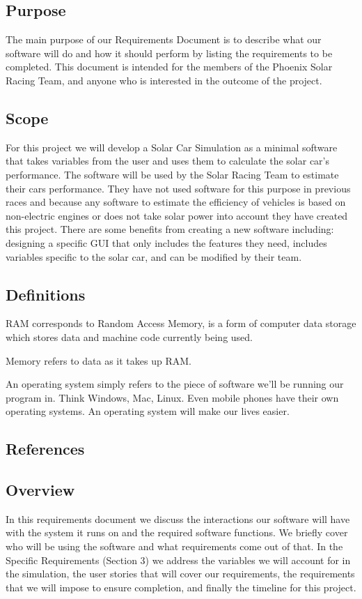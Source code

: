 \documentclass[onecolumn, draftclsnofoot,10pt, compsoc]{IEEEtran}
\begin{document}
    \subsection{Purpose}
    The main purpose of our Requirements Document is to describe what our software will do and how it should perform by listing the requirements to be completed.
    This document is intended for the members of the Phoenix Solar Racing Team, and anyone who is interested in the outcome of the project.
    
    \subsection{Scope}
    For this project we will develop a Solar Car Simulation as a minimal software that takes variables from the user and uses them to calculate the solar car's performance.
    The software will be used by the Solar Racing Team to estimate their cars performance. 
    They have not used software for this purpose in previous races and because any software to estimate the efficiency of vehicles is based on non-electric engines or does not take solar power into account they have created this project. There are some benefits from creating a new software including: designing a specific GUI that only includes the features they need, includes variables specific to the solar car, and can be modified by their team.
    
    \subsection{Definitions}
    RAM corresponds to Random Access Memory, is a form of computer data storage which stores data and machine code currently being used.
    
    Memory refers to data as it takes up RAM.
    
    An operating system simply refers to the piece of software we'll be running our program in.
    Think Windows, Mac, Linux.
    Even mobile phones have their own operating systems.
    An operating system will make our lives easier.
    
    \subsection{References}
    
    \subsection{Overview}
    In this requirements document we discuss the interactions our software will have with the system it runs on and the required software functions. We briefly cover who will be using the software and what requirements come out of that. In the Specific Requirements (Section 3) we address the variables we will account for in the simulation, the user stories that will cover our requirements, the requirements that we will impose to ensure completion, and finally the timeline for this project.
\end{document}
